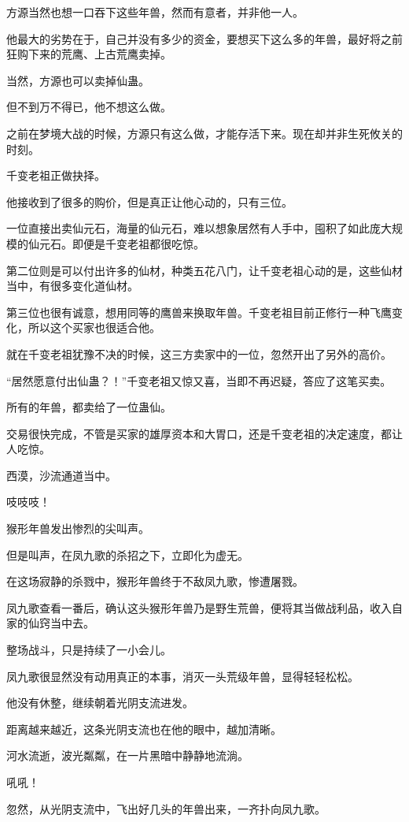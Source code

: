 \begin{this_body}
方源当然也想一口吞下这些年兽，然而有意者，并非他一人。

他最大的劣势在于，自己并没有多少的资金，要想买下这么多的年兽，最好将之前狂购下来的荒鹰、上古荒鹰卖掉。

当然，方源也可以卖掉仙蛊。

但不到万不得已，他不想这么做。

之前在梦境大战的时候，方源只有这么做，才能存活下来。现在却并非生死攸关的时刻。

千变老祖正做抉择。

他接收到了很多的购价，但是真正让他心动的，只有三位。

一位直接出卖仙元石，海量的仙元石，难以想象居然有人手中，囤积了如此庞大规模的仙元石。即便是千变老祖都很吃惊。

第二位则是可以付出许多的仙材，种类五花八门，让千变老祖心动的是，这些仙材当中，有很多变化道仙材。

第三位也很有诚意，想用同等的鹰兽来换取年兽。千变老祖目前正修行一种飞鹰变化，所以这个买家也很适合他。

就在千变老祖犹豫不决的时候，这三方卖家中的一位，忽然开出了另外的高价。

“居然愿意付出仙蛊？！”千变老祖又惊又喜，当即不再迟疑，答应了这笔买卖。

所有的年兽，都卖给了一位蛊仙。

交易很快完成，不管是买家的雄厚资本和大胃口，还是千变老祖的决定速度，都让人吃惊。

西漠，沙流通道当中。

吱吱吱！

猴形年兽发出惨烈的尖叫声。

但是叫声，在凤九歌的杀招之下，立即化为虚无。

在这场寂静的杀戮中，猴形年兽终于不敌凤九歌，惨遭屠戮。

凤九歌查看一番后，确认这头猴形年兽乃是野生荒兽，便将其当做战利品，收入自家的仙窍当中去。

整场战斗，只是持续了一小会儿。

凤九歌很显然没有动用真正的本事，消灭一头荒级年兽，显得轻轻松松。

他没有休整，继续朝着光阴支流进发。

距离越来越近，这条光阴支流也在他的眼中，越加清晰。

河水流逝，波光粼粼，在一片黑暗中静静地流淌。

吼吼！

忽然，从光阴支流中，飞出好几头的年兽出来，一齐扑向凤九歌。


\end{this_body}
